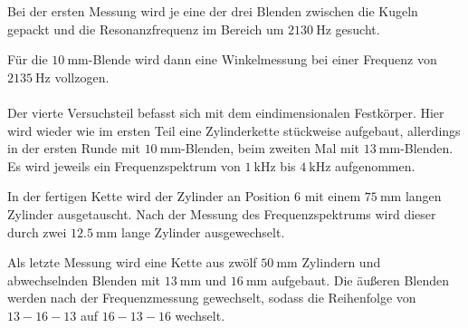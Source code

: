 Bei der ersten Messung wird je eine der drei Blenden zwischen die Kugeln gepackt
und die Resonanzfrequenz im Bereich um $\SI{2130}{\hertz}$ gesucht.

Für die $\SI{10}{\milli\meter}$-Blende wird dann eine Winkelmessung bei einer
Frequenz von $\SI{2135}{\hertz}$ vollzogen.
\\~\\
Der vierte Versuchsteil befasst sich mit dem eindimensionalen Festkörper.
Hier wird wieder wie im ersten Teil eine Zylinderkette stückweise aufgebaut,
allerdings in der ersten Runde mit $\SI{10}{\milli\meter}$-Blenden,
beim zweiten Mal mit $\SI{13}{\milli\meter}$-Blenden.
Es wird jeweils ein Frequenzspektrum von $\SI{1}{\kilo\hertz}$ bis
$\SI{4}{\kilo\hertz}$ aufgenommen.

In der fertigen Kette wird der Zylinder an Position 6 mit einem
$\SI{75}{\milli\meter}$ langen Zylinder ausgetauscht.
Nach der Messung des Frequenzspektrums wird dieser durch zwei
$\SI{12.5}{\milli\meter}$ lange Zylinder ausgewechselt.

Als letzte Messung wird eine Kette aus zwölf $\SI{50}{\milli\meter}$ Zylindern
und abwechselnden Blenden mit $\SI{13}{\milli\meter}$ und $\SI{16}{\milli\meter}$
aufgebaut. Die äußeren Blenden werden nach der Frequenzmessung gewechselt,
sodass die Reihenfolge von $13-16-13$ auf $16-13-16$ wechselt.
